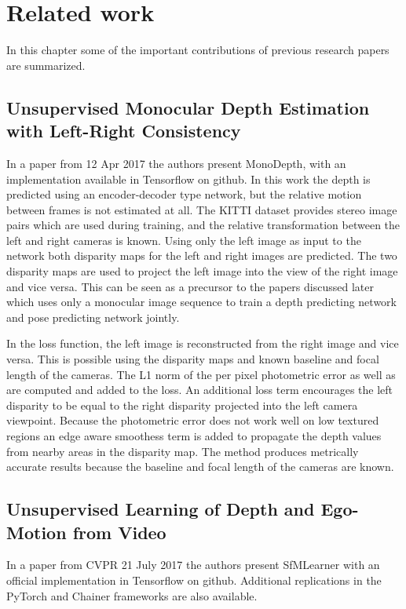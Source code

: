 \chapter{Related work}\label{cha:relatedwork}


In this chapter some of the important contributions of previous research papers are summarized.

\section{Unsupervised Monocular Depth Estimation with Left-Right Consistency \cite{leftright}}
\label{sec:relwork:leftright}
In a paper from 12 Apr 2017 the authors present MonoDepth, with an implementation available in Tensorflow on github. In this work the depth is predicted using an encoder-decoder type network, but the relative motion between frames is not estimated at all. The KITTI dataset provides stereo image pairs which are used during training, and the relative transformation between the left and right cameras is known. Using only the left image as input to the network both disparity maps for the left and right images are predicted. The two disparity maps are used to project the left image into the view of the right image and vice versa. This can be seen as a precursor to the papers discussed later which uses only a monocular image sequence to train a depth predicting network and pose predicting network jointly.

In the loss function, the left image is reconstructed from the right image and vice versa. This is possible using the disparity maps and known baseline and focal length of the cameras. The L1 norm of the per pixel photometric error as well as \abbrSSIM are computed and added to the loss. An additional loss term encourages the left disparity to be equal to the right disparity projected into the left camera viewpoint. Because the photometric error does not work well on low textured regions an edge aware smoothess term is added to propagate the depth values from nearby areas in the disparity map. The method produces metrically accurate results because the baseline and focal length of the cameras are known.

\section{Unsupervised Learning of Depth and Ego-Motion from Video \cite{sfmlearner}}
\label{sec:relwork:unego}
In a paper from CVPR 21 July 2017 the authors present SfMLearner with an official implementation in Tensorflow on github. Additional replications in the PyTorch and Chainer frameworks are also available.

